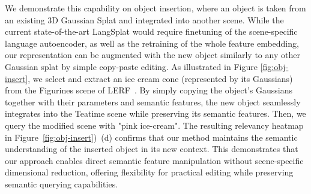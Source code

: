We demonstrate this capability on object insertion, where an object is taken from an existing 3D Gaussian Splat and integrated into another scene. While the current state-of-the-art LangSplat would require finetuning of the scene-specific language autoencoder, as well as the retraining of the whole feature embedding, our representation can be augmented with the new object similarly to any other Gaussian splat by simple copy-paste editing. As illustrated in Figure \ref{fig:obj-insert}, we select and extract an ice cream cone (represented by its Gaussians) from the Figurines scene of LERF~\cite{kerr2023lerf}. By simply copying the object's Gaussians together with their parameters and semantic features, the new object seamlessly integrates into the Teatime scene while preserving its semantic features. Then, we query the modified scene with "pink ice-cream". The resulting relevancy heatmap in Figure~\ref{fig:obj-insert})~(d) confirms that our method maintains the semantic understanding of the inserted object in its new context. This demonstrates that our approach enables direct semantic feature manipulation without scene-specific dimensional reduction, offering flexibility for practical editing while preserving semantic querying capabilities.
